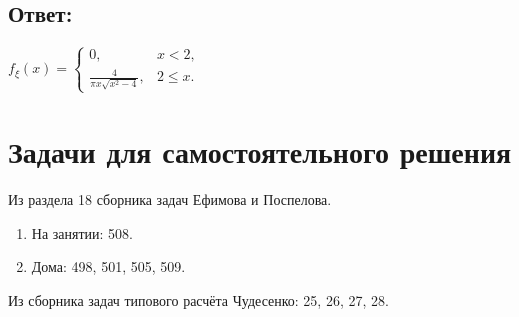 \subsection*{Ответ:}
$
f_\xi(x)
= \left \{
\begin{array}{ll}
    0,                              & x < 2 ,   \\
    \frac{4}{\pi x \sqrt{x^2 - 4}}, & 2 \le x .
\end{array}
\right .
$

\section*{Задачи для самостоятельного решения}

Из раздела 18 сборника задач Ефимова и Поспелова.
\begin{enumerate}
    \item На занятии: 508.
    \item Дома: 498, 501, 505, 509.
\end{enumerate}

Из сборника задач типового расчёта Чудесенко: 25, 26, 27, 28.